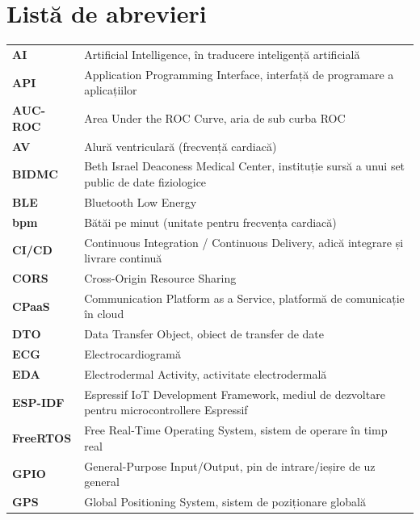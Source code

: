 \documentclass[12pt,a4paper,twoside]{article}
\begin{document}


\newpage
\tableofcontents
\newpage

{}
\listoffigures
\newpage

{}
\listoftables
\newpage

{}
\section*{Listă de abrevieri}

{\small
\renewcommand{\arraystretch}{1.25}
\begin{longtable}{@{}>{\bfseries}p{2.7cm}p{10.6cm}@{}}
AI & Artificial Intelligence, în traducere inteligență artificială\\
API & Application Programming Interface, interfață de programare a aplicațiilor\\
AUC-ROC & Area Under the ROC Curve, aria de sub curba ROC\\
AV & Alură ventriculară (frecvență cardiacă)\\
BIDMC & Beth Israel Deaconess Medical Center, instituție sursă a unui set public de date fiziologice\\
BLE & Bluetooth Low Energy\\
bpm & Bătăi pe minut (unitate pentru frecvența cardiacă)\\
CI/CD & Continuous Integration / Continuous Delivery, adică integrare și livrare continuă\\
CORS & Cross-Origin Resource Sharing\\
CPaaS & Communication Platform as a Service, platformă de comunicație în cloud\\
DTO & Data Transfer Object, obiect de transfer de date\\
ECG & Electrocardiogramă\\
EDA & Electrodermal Activity, activitate electrodermală\\
ESP-IDF & Espressif IoT Development Framework, mediul de dezvoltare pentru microcontrollere Espressif\\
FreeRTOS & Free Real-Time Operating System, sistem de operare în timp real\\
GPIO & General-Purpose Input/Output, pin de intrare/ieșire de uz general\\
GPS & Global Positioning System, sistem de poziționare globală\\

\end{longtable}}
\end{document}
